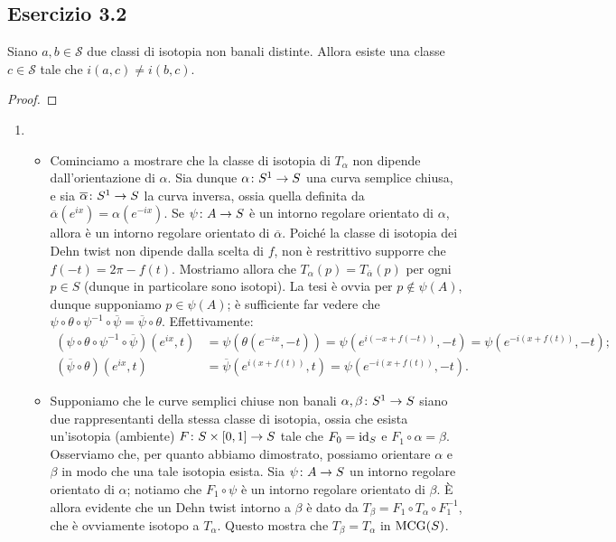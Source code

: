\subsection*{Esercizio 3.2}
\begin{lemma}
Siano $a,b\in\mathcal{S}$ due classi di isotopia non banali distinte. Allora esiste una classe $c\in\mathcal{S}$ tale che $i(a,c)\neq i(b,c)$.
\end{lemma}
\begin{proof}

\end{proof}
\begin{enumerate}[(1)]
\item \begin{itemize}
\item Cominciamo a mostrare che la classe di isotopia di $T_\alpha$ non dipende dall'orientazione di $\alpha$. Sia dunque $\map{\alpha}{S^1}{S}$ una curva semplice chiusa, e sia $\map{\overline\alpha}{S^1}{S}$ la curva inversa, ossia quella definita da $\overline\alpha(e^{ix})=\alpha(e^{-ix})$. Se $\map{\psi}{A}{S}$ è un intorno regolare orientato di $\alpha$, allora
è un intorno regolare orientato di $\overline\alpha$. Poiché la classe di isotopia dei Dehn twist non dipende dalla scelta di $f$, non è restrittivo supporre che $f(-t)=2\pi-f(t)$. Mostriamo allora che $T_\alpha(p)=T_{\overline\alpha}(p)$ per ogni $p\in S$ (dunque in particolare sono isotopi). La tesi è ovvia per $p\not\in\psi(A)$, dunque supponiamo $p\in\psi(A)$; è sufficiente far vedere che $\psi\circ\theta\circ\psi^{-1}\circ\overline\psi=\overline\psi\circ\theta$. Effettivamente:
\begin{align*}
(\psi\circ\theta\circ\psi^{-1}\circ\overline\psi)(e^{ix},t)&=\psi(\theta(e^{-ix},-t))=\psi(e^{i(-x+f(-t))},-t)=\psi(e^{-i(x+f(t))},-t);\\
(\overline\psi\circ\theta)(e^{ix},t)&=\overline\psi(e^{i(x+f(t))},t)=\psi(e^{-i(x+f(t))},-t).
\end{align*}
\item Supponiamo che le curve semplici chiuse non banali $\map{\alpha,\beta}{S^1}{S}$ siano due rappresentanti della stessa classe di isotopia, ossia che esista un'isotopia (ambiente) $\map{F}{S\times[0,1]}{S}$ tale che $F_0=\operatorname{id}_S$ e $F_1\circ\alpha=\beta$. Osserviamo che, per quanto abbiamo dimostrato, possiamo orientare $\alpha$ e $\beta$ in modo che una tale isotopia esista. Sia $\map{\psi}{A}{S}$ un intorno regolare orientato di $\alpha$; notiamo che $F_1\circ\psi$ è un intorno regolare orientato di $\beta$. È allora evidente che un Dehn twist intorno a $\beta$ è dato da $T_\beta=F_1\circ T_\alpha\circ F_1^{-1}$, che è ovviamente isotopo a $T_\alpha$. Questo mostra che $T_\beta=T_\alpha$ in $\operatorname{MCG}(S)$.

\end{itemize}
\end{enumerate}

